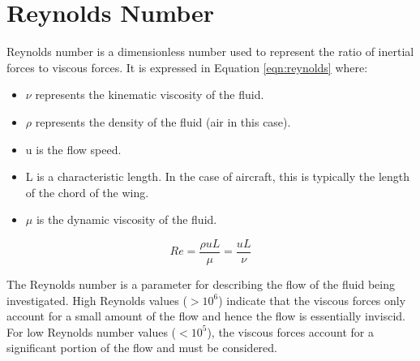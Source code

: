 \section{Reynolds Number}
Reynolds number is a dimensionless number used to represent the ratio of inertial forces to viscous forces. It is expressed in Equation \ref{eqn:reynolds} where:

\begin{itemize}
    \item $\nu$ represents the kinematic viscosity of the fluid.
    \item $\rho$ represents the density of the fluid (air in this case).
    \item u is the flow speed.
    \item L is a characteristic length. In the case of aircraft, this is typically the length of the chord of the wing.
    \item $\mu$ is the dynamic viscosity of the fluid.
\end{itemize} 

\begin{equation}
    Re = \frac{\rho uL}{\mu} = \frac{uL}{\nu}
    \label{eqn:reynolds}
\end{equation}


The Reynolds number is a parameter for describing the flow of the fluid being investigated. High Reynolds values ($> 10^{6}$) indicate that the viscous forces only account for a small amount of the flow and hence the flow is essentially inviscid. For low Reynolds number values ($< 10^{5}$), the viscous forces account for a significant portion of the flow and must be considered.




